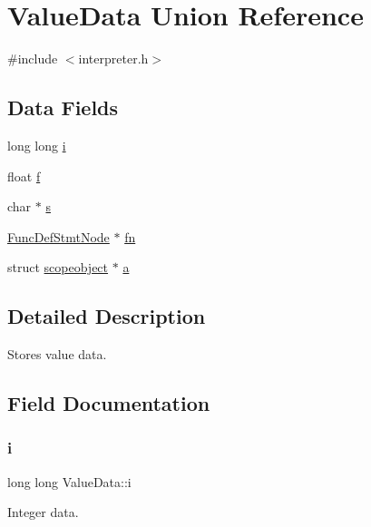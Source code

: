 \hypertarget{union_value_data}{}\section{Value\+Data Union Reference}
\label{union_value_data}


{\ttfamily \#include $<$interpreter.\+h$>$}

\subsection*{Data Fields}
\begin{DoxyCompactItemize}
\item 
long long \hyperlink{union_value_data_afe454167733fd44bda356fee1b471df5}{i}
\item 
float \hyperlink{union_value_data_a85311c11b54183bb571f35ed70af37a9}{f}
\item 
char $\ast$ \hyperlink{union_value_data_a2639b48549e0788d5f9a3da6ea9cb0e4}{s}
\item 
\hyperlink{struct_func_def_stmt_node}{Func\+Def\+Stmt\+Node} $\ast$ \hyperlink{union_value_data_a594cfb13fb480c8bd1d1c4ae61b90b1b}{fn}
\item 
struct \hyperlink{structscopeobject}{scopeobject} $\ast$ \hyperlink{union_value_data_ada5802e9c9ae4f8f0ce47b5cdfcc0def}{a}
\end{DoxyCompactItemize}


\subsection{Detailed Description}
Stores value data. 

\subsection{Field Documentation}
\mbox{\label{union_value_data_afe454167733fd44bda356fee1b471df5}} 
\subsubsection{\texorpdfstring{i}{i}}
{\footnotesize\ttfamily long long Value\+Data\+::i}

Integer data. \mbox{\label{union_value_data_a85311c11b54183bb571f35ed70af37a9}} 
